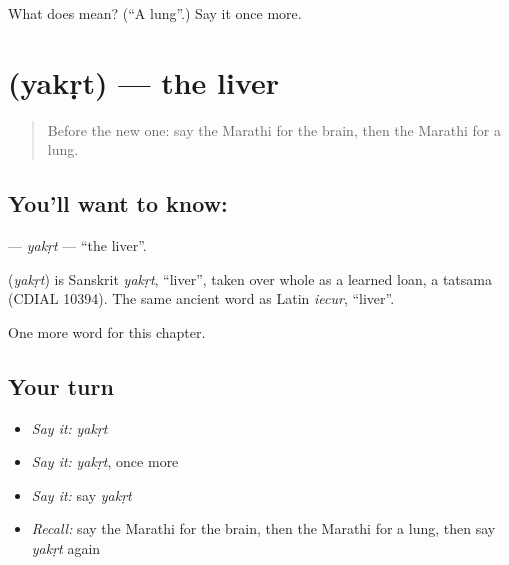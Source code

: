\begin{tcolorbox}[breakable,colback=teal!4,colframe=teal!35!black,title={Before you move on}]
What does  mean? (\textquotedblleft{}A lung\textquotedblright{}.) Say it once more.
\end{tcolorbox}
\section[\texorpdfstring{\mr{यकृत} (yakṛt)}{यकृत (yakṛt)}]{ (yakṛt) — the liver}

\label{lesson:MR-C169-yakrt}



\begin{quote}
Before the new one: say the Marathi for the brain, then the Marathi for a lung.
\end{quote}

\subsection*{You'll want to know: }
\textbf{} — \emph{yakṛt} — \textquotedblleft{}the liver\textquotedblright{}.

\begin{cousinweb}
\textbf{} (\emph{yakṛt}) is Sanskrit \emph{yakṛt}, \textquotedblleft{}liver\textquotedblright{}, taken over whole as a learned loan, a tatsama (CDIAL 10394). The same ancient word as Latin \emph{iecur}, \textquotedblleft{}liver\textquotedblright{}.
\end{cousinweb}

\begin{grammarlens}[title={What you've built}]
One more word for this chapter.
\end{grammarlens}

\subsection*{Your turn}
\begin{itemize}
\raggedright
  \item \emph{Say it:} \emph{yakṛt}
  \item \emph{Say it:} \emph{yakṛt}, once more
  \item \emph{Say it:} say \emph{yakṛt}
  \item \emph{Recall:} say the Marathi for the brain, then the Marathi for a lung, then say \emph{yakṛt} again
\end{itemize}

